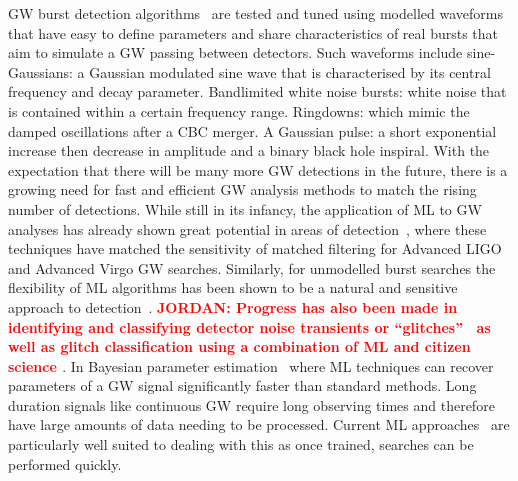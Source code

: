 \documentclass[12pt]{iopart}
\newcommand{\jordan}[1]{\textbf{\textcolor{red}{JORDAN: #1}}}
\begin{document}
%
GW burst detection algorithms~\cite{drago2020coherent,Klimenko_2008, Aso_2008} are tested
and tuned using modelled waveforms that have easy to define parameters and share characteristics of real bursts that aim to simulate a GW passing between
detectors. Such waveforms include sine-Gaussians: a
Gaussian modulated sine wave that is characterised by its central frequency and
decay parameter. Bandlimited white noise bursts: white noise that is contained
within a certain frequency range. Ringdowns: which mimic the damped
oscillations after a \ac{CBC} merger. A Gaussian pulse: a short exponential increase then decrease in amplitude and a binary black hole inspiral.
%
%
With the expectation that there will be many more GW detections in the
future, there is a growing need for fast and efficient GW analysis methods
to match the rising number of detections. While still in its infancy, the application of \ac{ML} to GW analyses has already shown great potential in areas of detection~\cite{Gabbard2017,Gebhard_2019,Krastev_2020}, where these techniques have matched the sensitivity of matched filtering for Advanced LIGO and Advanced Virgo GW searches. Similarly, for unmodelled burst searches the flexibility of \ac{ML} algorithms has been shown to be a natural and sensitive approach to detection~\cite{2020arXiv200914611S, PhysRevD.103.063011}. \jordan{Progress has also been made in identifying and classifying detector noise transients or  ``glitches''~\cite{Bahaadini, George_2018,Razzano_2018, 2020arXiv200801262G} as well as glitch classification using a combination of \ac{ML} and citizen science \cite{gravityspy_2017}}. In Bayesian parameter estimation~\cite{gabbard2019bayesian,Chua:2019,green2020gravitationalwave} where \ac{ML} techniques can recover parameters of a GW signal significantly faster than standard methods. Long duration signals like continuous GW require long observing times and therefore have large amounts of data needing to be processed. Current \ac{ML} approaches~\cite{2020PhRvD.102b2005D, 2019PhRvD.100d4009D, 2020arXiv200708207B} are particularly well suited to dealing with this as once trained, searches can be performed quickly.
\end{document}
